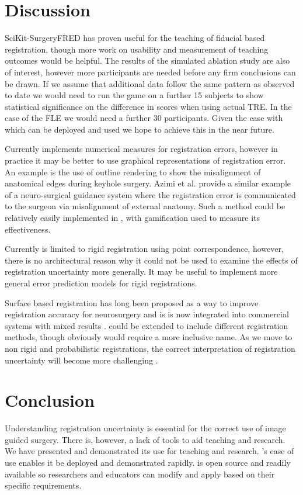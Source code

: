 \section{Discussion}
SciKit-SurgeryFRED has proven useful for the teaching of fiducial based registration,
though more work on usability and measurement of teaching outcomes would be helpful. 
The results of the simulated ablation study 
are also of interest, however more participants are needed before any firm conclusions
can be drawn.
If we assume that additional data follow the same pattern as observed to date we
would need to run the game on a further 15 subjects to show statistical significance
on the difference in scores when using actual \gls{TRE}. In the case of the
\gls{FLE} we would need a further 30 participants. Given the ease with
which \fred can be deployed and used we hope to achieve this in the near future.

Currently \fred implements numerical measures for registration errors, however
in practice it may be better to use
graphical representations of registration error. An example is the use of
outline rendering to show the misalignment of anatomical edges during keyhole 
surgery\cite{PMID:29663273}. Azimi et al. \cite{10.1007/978-3-030-59716-0_7} 
provide a similar example of a neuro-surgical guidance system where the 
registration error is communicated to the surgeon via misalignment of 
external anatomy. Such a method could be relatively easily implemented in \fredns, with
gamification used to measure its effectiveness. 

Currently \fred is limited to rigid registration using point correspondence, however, 
there is no architectural reason why it could not be used to examine the 
effects of registration uncertainty more generally. It may be useful to implement 
more general error prediction models for rigid registrations\cite{4359072,5629373}.

Surface based registration has long been proposed as a way to improve 
registration accuracy for neurosurgery \cite{736031} and is 
is now integrated into commercial systems with mixed results \cite{mongen2020}.
\fred could 
be extended to include different registration methods, though obviously would 
require a more inclusive name. As we move to non rigid and 
probabilistic registrations, the correct interpretation of registration 
uncertainty will become more challenging \cite{10.1007/978-3-030-59716-0_26}.

\section{Conclusion}
Understanding registration uncertainty is essential for the correct 
use of image guided surgery. There is, however, a lack of tools to 
aid teaching and research.
We have presented \fred and demonstrated its use for teaching and research. 
\fredns's ease of use enables it be deployed and demonstrated rapidly. \fred is
 open source and readily available so researchers and educators can 
 modify and apply \fred based on their specific requirements.

